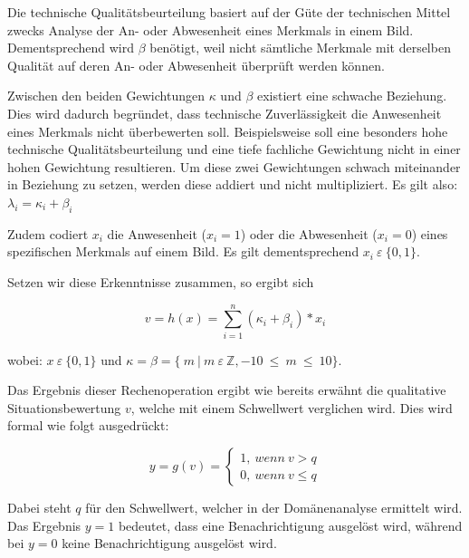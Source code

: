 Die technische Qualitätsbeurteilung basiert auf der Güte der technischen Mittel zwecks Analyse der An- oder Abwesenheit eines Merkmals in einem Bild. Dementsprechend wird $\beta$ benötigt, weil nicht sämtliche Merkmale mit derselben Qualität auf deren An- oder Abwesenheit überprüft werden können.

Zwischen den beiden Gewichtungen $\kappa$ und $\beta$ existiert eine schwache Beziehung. Dies wird dadurch begründet, dass technische Zuverlässigkeit die Anwesenheit eines Merkmals nicht überbewerten soll. Beispielsweise soll eine besonders hohe technische Qualitätsbeurteilung und eine tiefe fachliche Gewichtung nicht in einer hohen Gewichtung resultieren. Um diese zwei Gewichtungen schwach miteinander in Beziehung zu setzen, werden diese addiert und nicht multipliziert. Es gilt also: $\lambda_{i} = \kappa_{i} + \beta_{i}$

Zudem codiert $x_{i}$ die Anwesenheit ($x_{i}=1$) oder die Abwesenheit ($x_{i}=0$) eines spezifischen Merkmals auf einem Bild. Es gilt dementsprechend  $ x_{i} \:  \varepsilon \: \{0,1\}. $ 


Setzen wir diese Erkenntnisse zusammen, so ergibt sich

\begin{equation}\label{Vollständige Linerarkombination zur Geburtsprognose}
v = h(x) = \sum_{i=1}^n (\kappa_{i}+\beta_{i}) *x_{i}
\end{equation}

wobei:  $ x \:  \varepsilon \: \{0,1\} $ und $\kappa = \beta = \{ \:  m \: | \:  m \:  \varepsilon \:  \mathbb{Z}, -10 \:  \leq \: m \: \leq \:  10\} $.

Das Ergebnis dieser Rechenoperation ergibt wie bereits erwähnt die qualitative Situationsbewertung $v$, welche mit einem Schwellwert verglichen wird. Dies wird formal wie folgt ausgedrückt:

\begin{equation}\label{Vollständige Linerarkombination zur Geburtsprognose}
y = g(v) =\begin{cases}
			1,\: wenn \: v > q\\
			0,\: wenn \: v \leq q
\end{cases}
\end{equation}

Dabei steht $q$ für den Schwellwert, welcher in der Domänenanalyse ermittelt wird. Das Ergebnis $y=1$ bedeutet, dass eine Benachrichtigung ausgelöst wird, während bei $y=0$ keine Benachrichtigung ausgelöst wird.

 






